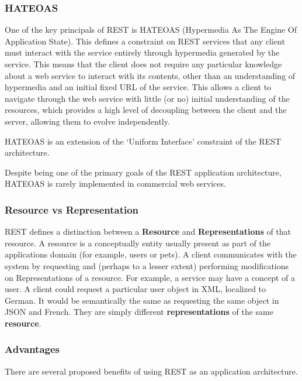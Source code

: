 \documentclass{article}
\begin{document}
\subsubsection{HATEOAS}
One of the key principals of REST is HATEOAS (Hypermedia As The Engine Of Application State). This defines a constraint on REST services that any client must interact with the service entirely through hypermedia generated by the service. This means that the client does not require any particular knowledge about a web service to interact with its contents, other than an understanding of hypermedia and an initial fixed URL of the service. This allows a client to navigate through the web service with little (or no) initial understanding of the resources, which provides a high level of decoupling between the client and the server, allowing them to evolve independently.

HATEOAS is an extension of the `Uniform Interface' constraint of the REST architecture.

Despite being one of the primary goals of the REST application architecture, HATEOAS is rarely implemented in commercial web services. 

\subsubsection{Resource vs Representation}
REST defines a distinction between a \textbf{Resource} and \textbf{Representations} of that resource. A resource is a conceptually entity usually present as part of the applications domain (for example, users or pets). A client communicates with the system by requesting and (perhaps to a lesser extent) performing modifications on Representations of a resource. For example, a service may have a concept of a user. A client could request a particular user object in XML, localized to German. It would be semantically the same as requesting the same object in JSON and French. They are simply different \textbf{representations} of the same \textbf{resource}.

\subsubsection{Advantages}
There are several proposed benefits of using REST as an application architecture.
\end{document}
